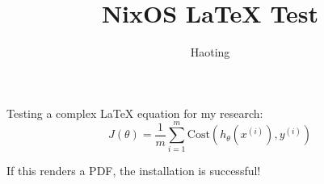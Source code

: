 \documentclass{article}
\title{NixOS LaTeX Test}
\author{Haoting}
\begin{document}
\maketitle

Testing a complex LaTeX equation for my research:
\begin{equation}
    J(\theta) = \frac{1}{m} \sum_{i=1}^{m} \text{Cost}(h_\theta(x^{(i)}), y^{(i)})
\end{equation}

If this renders a PDF, the installation is successful!
\end{document}
